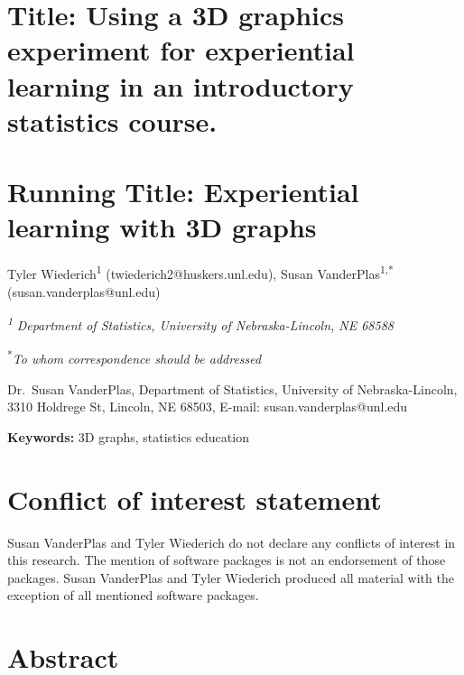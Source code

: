 \documentclass[
  12pt,
]{article}
\date{}
\begin{document}
\section{Title: Using a 3D graphics experiment for experiential learning
in an introductory statistics
course.}\label{title-using-a-3d-graphics-experiment-for-experiential-learning-in-an-introductory-statistics-course.}

\section{Running Title: Experiential learning with 3D
graphs}\label{running-title-experiential-learning-with-3d-graphs}

Tyler Wiederich\textsuperscript{1} (twiederich2@huskers.unl.edu), Susan
VanderPlas\textsuperscript{1,*} (susan.vanderplas@unl.edu)

\textsuperscript{\emph{1}} \emph{Department of Statistics, University of
Nebraska-Lincoln, NE 68588}

\textsuperscript{*}\emph{To whom correspondence should be addressed}

Dr.~Susan VanderPlas, Department of Statistics, University of
Nebraska-Lincoln, 3310 Holdrege St, Lincoln, NE 68503, E-mail:
susan.vanderplas@unl.edu

\textbf{Keywords:} 3D graphs, statistics education

\section{Conflict of interest
statement}\label{conflict-of-interest-statement}

Susan VanderPlas and Tyler Wiederich do not declare any conflicts of
interest in this research. The mention of software packages is not an
endorsement of those packages. Susan VanderPlas and Tyler Wiederich
produced all material with the exception of all mentioned software
packages.

\newpage

\section{Abstract}\label{abstract}
\end{document}
